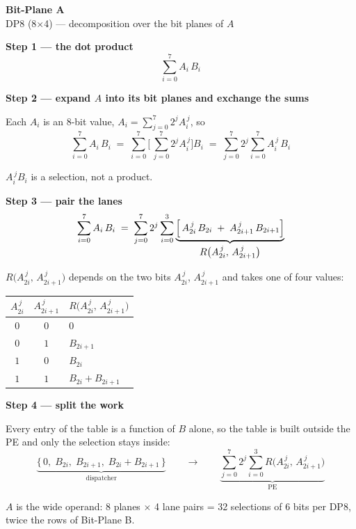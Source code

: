\documentclass[fleqn]{article}
\newcommand{\Rf}{R\bigl(A_{2i}^{\,j},\, A_{2i+1}^{\,j}\bigr)}
\begin{document}
\begin{center}
{\LARGE \textbf{Bit-Plane A}}\\[4pt]
{\large DP8 (8$\times$4) --- decomposition over the bit planes of $A$}
\end{center}

\vspace{3em}

\noindent\textbf{Step 1 --- the dot product}
\[
\sum_{i=0}^{7} A_i \, B_i
\]

\vspace{0.5em}

\noindent\textbf{Step 2 --- expand $A$ into its bit planes and exchange the sums}

\noindent Each $A_i$ is an 8-bit value, $A_i = \sum_{j=0}^{7} 2^{j} A_i^{\,j}$, so
\[
\sum_{i=0}^{7} A_i \, B_i
  \;=\; \sum_{i=0}^{7} \Biggl[\, \sum_{j=0}^{7} 2^{j} A_i^{\,j} \Biggr] B_i
  \;=\; \sum_{j=0}^{7} 2^{j} \sum_{i=0}^{7} A_i^{\,j} \, B_i
\]

\noindent $A_i^{\,j} B_i$ is a selection, not a product.

\vspace{0.5em}

\noindent\textbf{Step 3 --- pair the lanes}
\[
\sum_{i=0}^{7} A_i \, B_i
  \;=\; \sum_{j=0}^{7} 2^{j} \sum_{i=0}^{3}
        \underbrace{\Bigl[\, A_{2i}^{\,j} \, B_{2i} \;+\; A_{2i+1}^{\,j} \, B_{2i+1} \Bigr]}_{\textstyle \Rf}
\]

\noindent $\Rf$ depends on the two bits $A_{2i}^{\,j}$, $A_{2i+1}^{\,j}$ and takes one of
four values:

\vspace{1em}

\begin{center}
\renewcommand{\arraystretch}{1.35}
\begin{tabular}{c c | l}
$A_{2i}^{\,j}$ & $A_{2i+1}^{\,j}$ & \multicolumn{1}{c}{$\Rf$} \\
\hline
$0$ & $0$ & $0$ \\
$0$ & $1$ & $B_{2i+1}$ \\
$1$ & $0$ & $B_{2i}$ \\
$1$ & $1$ & $B_{2i} + B_{2i+1}$ \\
\end{tabular}
\end{center}

\vspace{1.5em}

\noindent\textbf{Step 4 --- split the work}

\noindent Every entry of the table is a function of $B$ alone, so the table is built
outside the PE and only the selection stays inside:
\[
\underbrace{\bigl\{\, 0,\; B_{2i},\; B_{2i+1},\; B_{2i} + B_{2i+1} \,\bigr\}}_{\textstyle \text{dispatcher}}
\qquad\longrightarrow\qquad
\underbrace{\sum_{j=0}^{7} 2^{j} \sum_{i=0}^{3} \Rf}_{\textstyle \text{PE}}
\]

\vspace{1.5em}

\noindent $A$ is the wide operand: 8 planes $\times$ 4 lane pairs = 32 selections of
6 bits per DP8, twice the rows of Bit-Plane B.
\end{document}
